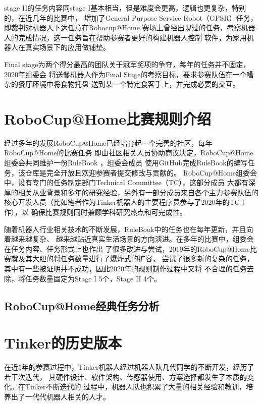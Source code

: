stage II的任务内容同stage I基本相当，但是难度会更高，逻辑也更复杂，特别的，在近几年的比赛中，
增加了General Purpose Service Robot（GPSR）任务，即裁判对机器人下达任意在Robocup@Home
赛场上曾经出现过的任务，考察机器人的完成情况，这一任务旨在帮助参赛者更好的构建机器人控制
软件，为家用机器人在真实场景下的应用做铺垫。

Final stage为两个得分最高的团队关于冠军奖项的争夺，每年的任务并不固定，2020年组委会
将送餐机器人作为Final Stage的考察目标，要求参赛队伍在一个嘈杂的餐厅环境中将食物托盘
送到某一个特定食客手上，并完成必要的交互。


\section{RoboCup@Home比赛规则介绍}

经过多年的发展RoboCup@Home已经培育起一个完善的社区，每年RoboCup@Home的比赛任务
即由社区相关人员协助商议决定，RoboCup@Home组委会共同维护一份RuleBook\cite{rulebook}
，组委会成员
使用GitHub完成RuleBook的编写任务，该仓库是完全开放且欢迎参赛者提交修改与贡献的。
RoboCup@Home组委会中，设有专门的任务制定部门Technical Committee（TC），这部分成员
大都有深厚的相关从业背景和多年的研究经验，另外有一部分成员来自各个主力参赛队伍的
核心开发人员（比如笔者作为Tinker机器人的主要程序员参与了2020年的TC工作），以
确保比赛规则同时兼顾学科研究热点和可完成性。

随着机器人行业相关技术的不断发展，RuleBook中的任务也在每年更新，并且向着越来越复杂、
越来越贴近真实生活场景的方向演进。在多年的比赛中，组委会在任务内容、任务形式上也作出
了很多改进与尝试，2019年的RoboCup@Home比赛就及其大胆的将任务数量进行了爆炸式的扩容，
尝试了很多新的复杂的任务，其中有一些被证明并不成功，因此2020年的规则制作过程中又将
不合理的任务去除，将任务数量固定为Stage I 5个，Stage II 4个。

\subsection{RoboCup@Home经典任务分析}




\section{Tinker的历史版本}

在近5年的参赛过程中，Tinker机器人经过机器人队几代同学的不断开发，经历了若干次迭代，
其硬件设计、软件架构、传感器使用、方案选择都发生了本质的变化。在Tinker不断迭代的
过程中，机器人队也积累了大量的相关经验和教训，培养出了一代代机器人相关的人才。

